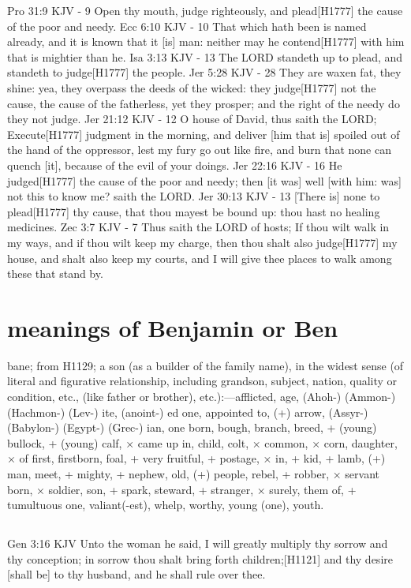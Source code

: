 \documentclass{book}
\begin{document}
Pro 31:9 KJV - 9 Open thy mouth, judge righteously, and plead[H1777] the cause of the poor and needy.
Ecc 6:10 KJV - 10 That which hath been is named already, and it is known that it [is] man: neither may he contend[H1777] with him that is mightier than he.
Isa 3:13 KJV - 13 The LORD standeth up to plead, and standeth to judge[H1777] the people.
Jer 5:28 KJV - 28 They are waxen fat, they shine: yea, they overpass the deeds of the wicked: they judge[H1777] not the cause, the cause of the fatherless, yet they prosper; and the right of the needy do they not judge.
Jer 21:12 KJV - 12 O house of David, thus saith the LORD; Execute[H1777] judgment in the morning, and deliver [him that is] spoiled out of the hand of the oppressor, lest my fury go out like fire, and burn that none can quench [it], because of the evil of your doings.
Jer 22:16 KJV - 16 He judged[H1777] the cause of the poor and needy; then [it was] well [with him: was] not this to know me? saith the LORD.
Jer 30:13 KJV - 13 [There is] none to plead[H1777] thy cause, that thou mayest be bound up: thou hast no healing medicines.
Zec 3:7 KJV - 7 Thus saith the LORD of hosts; If thou wilt walk in my ways, and if thou wilt keep my charge, then thou shalt also judge[H1777] my house, and shalt also keep my courts, and I will give thee places to walk among these that stand by.

\chapter{meanings of Benjamin or Ben}

bane; from H1129; a son (as a builder of the family name), in the widest sense (of literal and figurative relationship, including grandson, subject, nation, quality or condition, etc., (like father or brother), etc.):—afflicted, age, (Ahoh-) (Ammon-) (Hachmon-) (Lev-) ite, (anoint-) ed one, appointed to, (+) arrow, (Assyr-) (Babylon-) (Egypt-) (Grec-) ian, one born, bough, branch, breed, + (young) bullock, + (young) calf, × came up in, child, colt, × common, × corn, daughter, × of first, firstborn, foal, + very fruitful, + postage, × in, + kid, + lamb, (+) man, meet, + mighty, + nephew, old, (+) people, rebel, + robber, × servant born, × soldier, son, + spark, steward, + stranger, × surely, them of, + tumultuous one, valiant(-est), whelp, worthy, young (one), youth.

\section{}
Gen 3:16 KJV
Unto the woman he said, I will greatly multiply thy sorrow and thy conception; in sorrow thou shalt bring forth children;[H1121] and thy desire [shall be] to thy husband, and he shall rule over thee.
\end{document}
